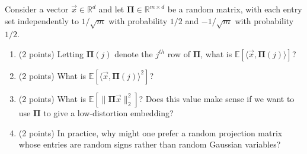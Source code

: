 \documentclass[11pt]{article}
\newcommand{\R}{\mathbb{R}}
\newcommand{\bv}[1]{\mathbf{#1}}
\newcommand{\norm}[1]{\|#1\|}
\newcommand{\E}{\mathbb{E}}
\begin{document}
\smallskip

\noindent Consider a vector $\vec x \in \R^d$ and let $\bv{\Pi} \in \R^{m \times d}$ be a random matrix, with each entry set independently to $1/\sqrt{m}$ with probability $1/2$ and $-1/\sqrt{m}$ with probability $1/2$. 
\begin{enumerate}
\item (2 points) Letting $\bv{\Pi}(j)$ denote the $j^{th}$ row of $\bv{\Pi}$, what is $\E[\langle \vec x, \bv{\Pi}(j) \rangle]$?
\vspace{11em}
\item (2 points) What is $\E[ \langle \vec x, \bv{\Pi}(j) \rangle^2]$?
\vspace{14em}
\item (2 points) What is $\E[ \norm{\bv{\Pi} \vec x}_2^2]$? Does this value make sense if we want to use $\bv{\Pi}$ to give a low-distortion embedding?
\vspace{10em}
\item (2 points) In practice, why might one prefer a random projection matrix whose entries are random signs rather than random Gaussian variables?
\end{enumerate}
\end{document}
